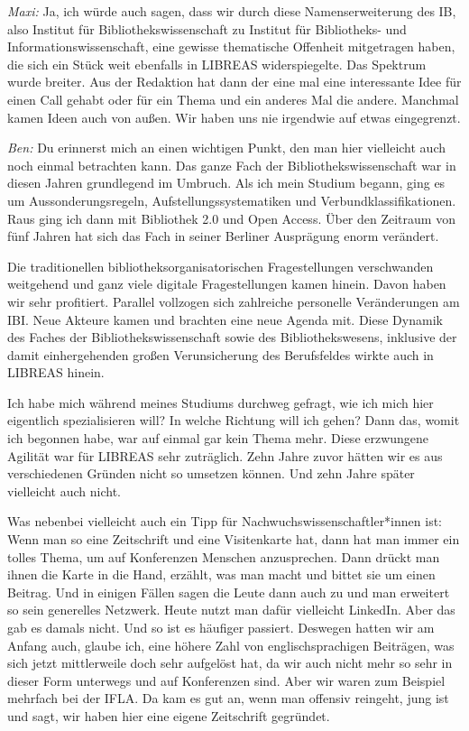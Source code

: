 \documentclass[a4paper,
fontsize=11pt,
oneside,
numbers=noperiodatend,
parskip=half-,
bibliography=totoc,
final
]{scrartcl}
\begin{document}
\emph{Maxi:} Ja, ich würde auch sagen, dass wir durch diese
Namenserweiterung des IB, also Institut für Bibliothekswissenschaft zu
Institut für Bibliotheks- und Informationswissenschaft, eine gewisse
thematische Offenheit mitgetragen haben, die sich ein Stück weit
ebenfalls in LIBREAS widerspiegelte. Das Spektrum wurde breiter. Aus der
Redaktion hat dann der eine mal eine interessante Idee für einen Call
gehabt oder für ein Thema und ein anderes Mal die andere. Manchmal kamen
Ideen auch von außen. Wir haben uns nie irgendwie auf etwas eingegrenzt.

\emph{Ben:} Du erinnerst mich an einen wichtigen Punkt, den man hier
vielleicht auch noch einmal betrachten kann. Das ganze Fach der
Bibliothekswissenschaft war in diesen Jahren grundlegend im Umbruch. Als
ich mein Studium begann, ging es um Aussonderungsregeln,
Aufstellungssystematiken und Verbundklassifikationen. Raus ging ich dann
mit Bibliothek 2.0 und Open Access. Über den Zeitraum von fünf Jahren
hat sich das Fach in seiner Berliner Ausprägung enorm verändert.

Die traditionellen bibliotheksorganisatorischen Fragestellungen
verschwanden weitgehend und ganz viele digitale Fragestellungen kamen
hinein. Davon haben wir sehr profitiert. Parallel vollzogen sich
zahlreiche personelle Veränderungen am IBI. Neue Akteure kamen und
brachten eine neue Agenda mit. Diese Dynamik des Faches der
Bibliothekswissenschaft sowie des Bibliothekswesens, inklusive der damit
einhergehenden großen Verunsicherung des Berufsfeldes wirkte auch in
LIBREAS hinein.

Ich habe mich während meines Studiums durchweg gefragt, wie ich mich
hier eigentlich spezialisieren will? In welche Richtung will ich gehen?
Dann das, womit ich begonnen habe, war auf einmal gar kein Thema mehr.
Diese erzwungene Agilität war für LIBREAS sehr zuträglich. Zehn Jahre
zuvor hätten wir es aus verschiedenen Gründen nicht so umsetzen können.
Und zehn Jahre später vielleicht auch nicht.

Was nebenbei vielleicht auch ein Tipp für Nachwuchswissenschaftler*innen
ist: Wenn man so eine Zeitschrift und eine Visitenkarte hat, dann hat
man immer ein tolles Thema, um auf Konferenzen Menschen anzusprechen.
Dann drückt man ihnen die Karte in die Hand, erzählt, was man macht und
bittet sie um einen Beitrag. Und in einigen Fällen sagen die Leute dann
auch zu und man erweitert so sein generelles Netzwerk. Heute nutzt man
dafür vielleicht LinkedIn. Aber das gab es damals nicht. Und so ist es
häufiger passiert. Deswegen hatten wir am Anfang auch, glaube ich, eine
höhere Zahl von englischsprachigen Beiträgen, was sich jetzt
mittlerweile doch sehr aufgelöst hat, da wir auch nicht mehr so sehr in
dieser Form unterwegs und auf Konferenzen sind. Aber wir waren zum
Beispiel mehrfach bei der IFLA. Da kam es gut an, wenn man offensiv
reingeht, jung ist und sagt, wir haben hier eine eigene Zeitschrift
gegründet.
\end{document}
